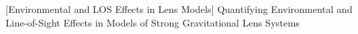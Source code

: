 [Environmental and LOS Effects in Lens Models]
{Quantifying Environmental and Line-of-Sight Effects in Models of Strong Gravitational Lens Systems}
  
  